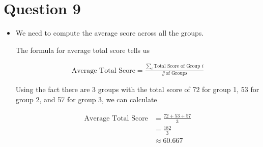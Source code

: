 \documentclass[12pt]{article}
\begin{document}
\section*{Question 9}

\bigskip

\begin{itemize}
    \item

    We need to compute the average score across all the groups.

    \bigskip

    The formula for average total score tells us

    \setcounter{equation}{0}
    \begin{align}
        \text{Average Total Score} = \frac{\sum\limits_{i} \text{Total Score of Group } i}{\text{\# of Groups}}
    \end{align}

    \bigskip

    Using the fact there are 3 groups with the total score of 72 for group 1,
    53 for group 2, and 57 for group 3, we can calculate

    \begin{align}
        \text{Average Total Score} &= \frac{72 + 53 + 57}{3}\\
        &= \frac{182}{3}\\
        &\approx 60.667
    \end{align}
\end{itemize}

\bigskip
\end{document}
